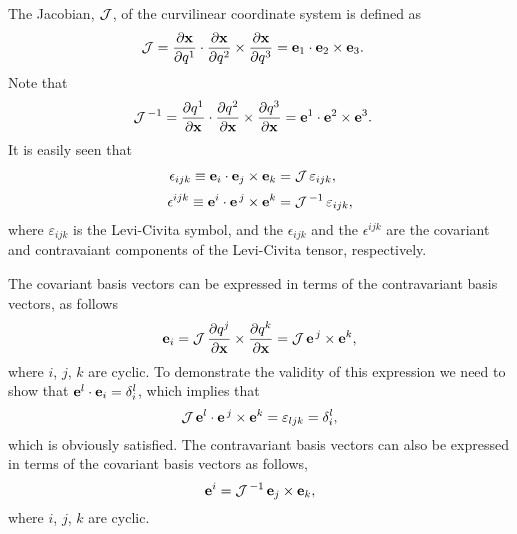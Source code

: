 \documentclass[12pt,prb,aps,notitlepage]{revtex4-1}
\begin{document}
The Jacobian, ${\cal J}$,  of the curvilinear coordinate system is defined as
\begin{align}\label{e4}
{\cal J} &= \frac{\partial{\bf x}}{\partial q^1}\cdot\frac{\partial {\bf x}}{\partial q^2}\times\frac{\partial{\bf x}}{\partial q^3}={\bf e}_1\cdot{\bf e}_2\times{\bf e}_3.
\end{align}
Note that
\begin{align}
{\cal J}^{\,-1} &= \frac{\partial q^1}{\partial {\bf x}}\cdot\frac{\partial q^2}{\partial{\bf x}}\times\frac{\partial q^3}{\partial{\bf x}}= {\bf e}^1\cdot{\bf e}^2\times{\bf e}^3.
\end{align}
It is easily seen that
\begin{align}
\epsilon_{ijk}\equiv {\bf e}_i\cdot{\bf e}_j\times{\bf e}_k&= {\cal J}\,\varepsilon_{ijk},\label{edown}\\[0.5ex]
\epsilon^{ijk}\equiv {\bf e}^i\cdot{\bf e}^{\,j}\times{\bf e}^k&= {\cal J}^{\,-1}\,\varepsilon_{ijk},\label{eup}
\end{align}
where $\varepsilon_{ijk}$ is the Levi-Civita symbol, and the $\epsilon_{ijk}$  and the $\epsilon^{ijk}$ are the covariant and
contravaiant components of the  Levi-Civita tensor, respectively. 

The covariant basis vectors can be expressed in terms of the contravariant basis vectors, as follows
\begin{equation}\label{e5}
{\bf e}_i = {\cal J}\,\frac{\partial q^j}{\partial {\bf x}}\times \frac{\partial{q^k}}{\partial{\bf x}}= {\cal J}\,{\bf e}^{\,j}\times{\bf e}^k,
\end{equation}
where $i$, $j$, $k$ are cyclic. To demonstrate the validity of this expression we need to show that ${\bf e}^l\cdot{\bf e}_i= \delta_i^l$, 
which implies that 
\begin{equation}
 {\cal J}\,{\bf e}^l\cdot{\bf e}^{\,j}\times {\bf e}^k= \varepsilon_{ljk}=\delta_i^l,
 \end{equation}
 which is obviously satisfied. The contravariant basis vectors can also be expressed in terms of the covariant basis vectors as follows, 
 \begin{equation}
 {\bf e}^i = {\cal J}^{\,-1}\,{\bf e}_j\times{\bf e}_k,
 \end{equation}
 where $i$, $j$, $k$ are cyclic. 
 
\end{document}
